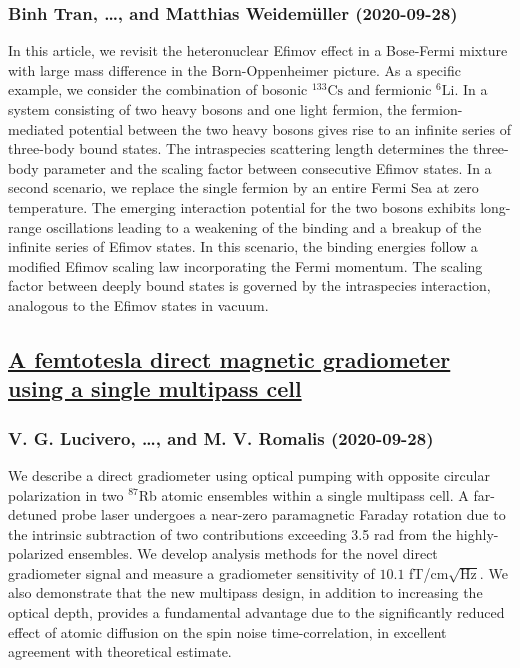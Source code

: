 \subsubsection*{Binh Tran, \dots, and Matthias Weidemüller (2020-09-28)}
In this article, we revisit the heteronuclear Efimov effect in a Bose-Fermi
mixture with large mass difference in the Born-Oppenheimer picture. As a
specific example, we consider the combination of bosonic $^{133}\mathrm{Cs}$
and fermionic $^6\mathrm{Li}$. In a system consisting of two heavy bosons and
one light fermion, the fermion-mediated potential between the two heavy bosons
gives rise to an infinite series of three-body bound states. The intraspecies
scattering length determines the three-body parameter and the scaling factor
between consecutive Efimov states. In a second scenario, we replace the single
fermion by an entire Fermi Sea at zero temperature. The emerging interaction
potential for the two bosons exhibits long-range oscillations leading to a
weakening of the binding and a breakup of the infinite series of Efimov states.
In this scenario, the binding energies follow a modified Efimov scaling law
incorporating the Fermi momentum. The scaling factor between deeply bound
states is governed by the intraspecies interaction, analogous to the Efimov
states in vacuum.

\subsection*{\href{http://arxiv.org/abs/2009.13212v1}{A femtotesla direct magnetic gradiometer using a single multipass cell}}
\subsubsection*{V. G. Lucivero, \dots, and M. V. Romalis (2020-09-28)}
We describe a direct gradiometer using optical pumping with opposite circular
polarization in two $^{87}$Rb atomic ensembles within a single multipass cell.
A far-detuned probe laser undergoes a near-zero paramagnetic Faraday rotation
due to the intrinsic subtraction of two contributions exceeding 3.5 rad from
the highly-polarized ensembles. We develop analysis methods for the novel
direct gradiometer signal and measure a gradiometer sensitivity of $10.1$
fT/cm$\sqrt{\mathrm{Hz}}$. We also demonstrate that the new multipass design,
in addition to increasing the optical depth, provides a fundamental advantage
due to the significantly reduced effect of atomic diffusion on the spin noise
time-correlation, in excellent agreement with theoretical estimate.

